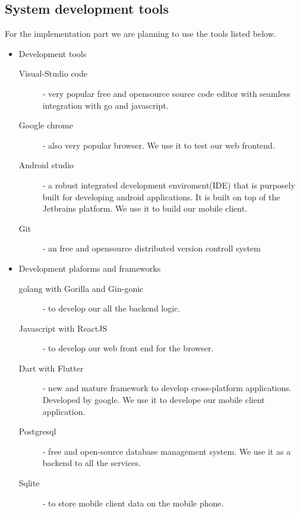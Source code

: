 		\subsection{System development tools}

For the implementation part we are planning to use the tools listed below.
\begin{itemize}
	\item Development tools
	\begin{description}
		\item[Visual-Studio code] - very popular free and opensource source code editor with seamless integration with go and javascript.
		\item[Google chrome] - also very popular browser. We use it to test our web frontend.
		\item[Android studio] - a robust integrated development enviroment(IDE) that is purposely built for developing android applications. It is built on top of the Jetbrains platform. We use it to build our mobile client.
		\item[Git] - an free and opensource distributed version controll system
	\end{description}
	\item Development plaforms and frameworks
	\begin{description}
		\item[golang with Gorilla and Gin-gonic] - to develop our all the backend logic.
		\item[Javascript with ReactJS] - to develop our web front end for the browser.
		\item[Dart with Flutter] - new and mature framework to develop cross-platform applications. Developed by google. We use it to develope our mobile client application.
		\item[Postgresql] - free and open-source database management system. We use it as a backend to all the services.
		\item[Sqlite] - to store mobile client data on the mobile phone.
	\end{description}


\end{itemize}
